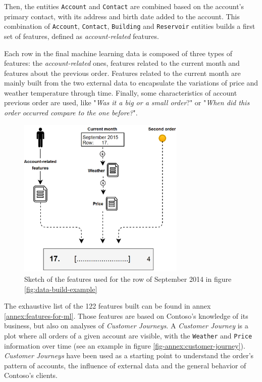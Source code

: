 Then, the entities \texttt{Account} and \texttt{Contact} are combined based on the account's primary contact, with its address and birth date added to the account. This combination of \texttt{Account}, \texttt{Contact}, \texttt{Building} and \texttt{Reservoir} entities builds a first set of features, defined as \textit{account-related} features.

Each row in the final machine learning data is composed of three types of features: the \textit{account-related} ones, features related to the current month and features about the previous order. Features related to the current month are mainly built from the two external data to encapsulate the variations of price and weather temperature through time. Finally, some characteristics of account previous order are used, like "\textit{Was it a big or a small order}?" or "\textit{When did this order occurred compare to the one before?}".


\begin{figure}[h]
    \centering
    \includegraphics[width=8cm]{images/data-build-ml-example-row.png}
    \caption[Features building for specific month]{Sketch of the features used for the row of September 2014 in figure \ref{fig:data-build-example}}
    \label{fig:data-build-row-example}
\end{figure}

The exhaustive list of the 122 features built can be found in annex \ref{annex:features-for-ml}. Those features are based on Contoso's knowledge of its business, but also on analyses of \textit{Customer Journeys}. A \textit{Customer Journey} is a plot where all orders of a given account are visible, with the \texttt{Weather} and \texttt{Price} information over time (see an example in figure \ref{fig-annex:customer-journey}). \textit{Customer Journeys} have been used as a starting point to understand the order's pattern of accounts, the influence of external data and the general behavior of Contoso's clients.

